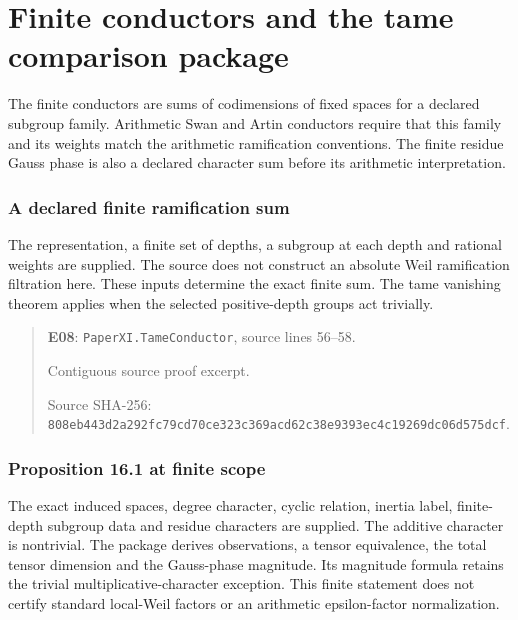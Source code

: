 \documentclass[10pt,oneside]{book}
\begin{document}

\chapter{Finite conductors and the tame comparison package}
The finite conductors are sums of codimensions of fixed spaces for a declared subgroup family. Arithmetic Swan and Artin conductors require that this family and its weights match the arithmetic ramification conventions. The finite residue Gauss phase is also a declared character sum before its arithmetic interpretation.

\subsection{A declared finite ramification sum}
\label{guide:E08}
The representation, a finite set of depths, a subgroup at each depth and rational weights are supplied. The source does not construct an absolute Weil ramification filtration here.
These inputs determine the exact finite sum. The tame vanishing theorem applies when the selected positive-depth groups act trivially.

\begin{quote}\footnotesize\textbf{E08}: \nolinkurl{PaperXI.TameConductor}, source lines 56--58.\par Contiguous source proof excerpt.\par Source SHA-256: {\scriptsize\texttt{808eb443d2a292fc79cd70ce323c369acd62c38e9393ec4c19269dc06d575dcf}}.\end{quote}


\subsection{Proposition 16.1 at finite scope}
\label{guide:E09}
The exact induced spaces, degree character, cyclic relation, inertia label, finite-depth subgroup data and residue characters are supplied. The additive character is nontrivial.
The package derives observations, a tensor equivalence, the total tensor dimension and the Gauss-phase magnitude. Its magnitude formula retains the trivial multiplicative-character exception. This finite statement does not certify standard local-Weil factors or an arithmetic epsilon-factor normalization.
\end{document}
